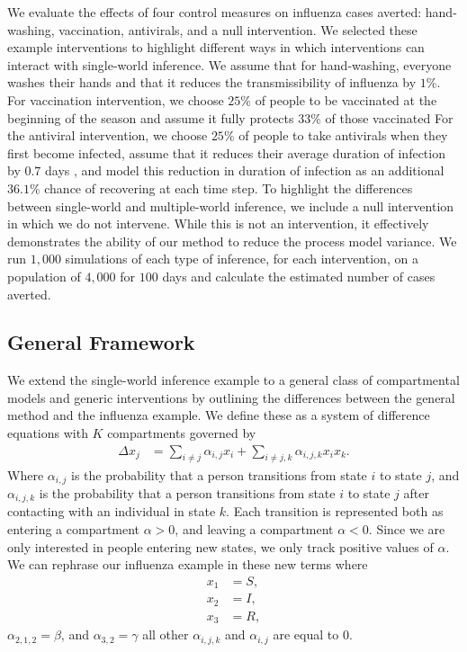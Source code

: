 \documentclass[PTRSB]{rsos}
\begin{document}
\begin{multicols}{2}
We evaluate the effects of four control measures on influenza cases averted: hand-washing, vaccination, antivirals, and a null intervention.
We selected these example interventions to highlight different ways in which interventions can interact with single-world inference.
We assume that for hand-washing, everyone washes their hands and that it reduces the transmissibility of influenza by $1\%$.
For vaccination intervention, we choose $25\%$ of people to be vaccinated at the beginning of the season and assume it fully protects $33\%$ of those vaccinated
For the antiviral intervention, we choose $25\%$ of people to take antivirals when they first become infected, assume that it reduces their average duration of infection by $0.7$ days \cite{oseltamivir:2014}, and model this reduction in duration of infection as an additional $36.1\%$ chance of recovering at each time step.
To highlight the differences between single-world and multiple-world inference, we include a null intervention in which we do not intervene.
While this is not an intervention, it effectively demonstrates the ability of our method to reduce the process model variance.
We run $1,000$ simulations of each type of inference, for each intervention, on a population of $4,000$ for $100$ days and calculate the estimated number of cases averted.

\subsection{General Framework}\label{subsection:general}

We extend the single-world inference example to a general class of compartmental models and generic interventions by outlining the differences between the general method and the influenza example.
We define these as a system of difference equations with $K$ compartments governed by 
\begin{align*}
\Delta x_{j} &= \sum_{i \neq j} \alpha_{i,j}x_i + \sum_{i \neq j, k} \alpha_{i,j,k} x_ix_k.
\end{align*}
Where $\alpha_{i,j}$ is the probability that a person transitions from state $i$ to state $j$, and $\alpha_{i,j,k}$ is the probability that a person transitions from state $i$ to state $j$ after contacting with an individual in state $k$.
Each transition is represented both as entering a compartment $\alpha > 0$, and leaving a compartment $\alpha < 0$.
Since we are only interested in people entering new states, we only track positive values of $\alpha$.
We can rephrase our influenza example in these new terms where
\begin{align*}
    x_1 &= S, \\
    x_2 &= I, \\
    x_3 &= R,
\end{align*}
$\alpha_{2,1,2} = \beta $, and $\alpha_{3,2} = \gamma$ all other $\alpha_{i,j,k}$ and $\alpha_{i,j}$ are equal to $0$.


\end{multicols}
\end{document}
